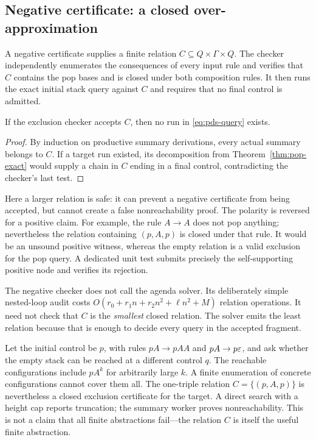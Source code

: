 \subsection{Negative certificate: a closed over-approximation}
A negative certificate supplies a finite relation
$C\subseteq Q\times\Gamma\times Q$. The checker independently enumerates the
consequences of every input rule and verifies that $C$ contains the pop bases
and is closed under both composition rules. It then runs the exact initial
stack query against $C$ and requires that no final control is admitted.

\begin{proposition}
If the exclusion checker accepts $C$, then no run in
\eqref{eq:pds-query} exists.
\end{proposition}
\begin{proof}
By induction on productive summary derivations, every actual summary belongs
to $C$. If a target run existed, its decomposition from
Theorem~\ref{thm:pop-exact} would supply a chain in $C$ ending in a final
control, contradicting the checker's last test.
\end{proof}

Here a larger relation is safe: it can prevent a negative certificate from
being accepted, but cannot create a false nonreachability proof. The polarity
is reversed for a positive claim. For example, the rule $A\to A$ does not pop
anything; nevertheless the relation containing $(p,A,p)$ is closed under that
rule. It would be an unsound positive witness, whereas the empty relation is a
valid exclusion for the pop query. A dedicated unit test submits precisely the
self-supporting positive node and verifies its rejection.

The negative checker does not call the agenda solver. Its deliberately simple
nested-loop audit costs
$O(r_0+r_1n+r_2n^2+\ell n^2+M)$ relation operations. It need not check that
$C$ is the \emph{smallest} closed relation. The solver emits the least relation
because that is enough to decide every query in the accepted fragment.

\begin{example}
Let the initial control be $p$, with rules
$pA\to pAA$ and $pA\to p\varepsilon$, and ask whether the empty stack can be reached
at a different control $q$. The reachable configurations include $pA^k$ for
arbitrarily large $k$. A finite enumeration of concrete configurations cannot
cover them all. The one-triple relation $C=\{(p,A,p)\}$ is nevertheless a closed
exclusion certificate for the target. A direct search with a height cap reports
truncation; the summary worker proves nonreachability. This is not a claim that
all finite abstractions fail---the relation $C$ is itself the useful finite
abstraction.
\end{example}

